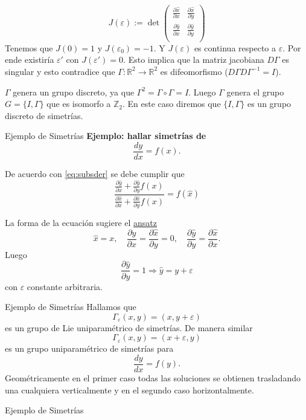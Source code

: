 \documentclass{article}
\newcommand{\rr}{\mathbb{R}}
\renewcommand{\emph}[1]{\textcolor[rgb]{1,0,0}{#1}}
\renewcommand{\epsilon}{\varepsilon}
\begin{document}
\[J(\epsilon):=\det\begin{pmatrix} \frac{\partial\hat{x}}{\partial x}&  \frac{\partial\hat{x}}{\partial y}\\
 \frac{\partial\hat{y}}{\partial x} &  \frac{\partial\hat{y}}{\partial y}\\
\end{pmatrix}
\]
 Tenemos que $J(0)=1$ y $J(\epsilon_0)=-1$. Y $J(\epsilon)$ es continua respecto a $\epsilon$. Por ende existiría $\epsilon'$ con $J(\epsilon')=0$. Esto implica que la matriz jacobiana $D\Gamma$ es singular y esto contradice que $\Gamma:\rr^2\to \rr^2$ es difeomorfismo ($D\Gamma D\Gamma^{-1}=I$).



 $\Gamma$  genera un grupo discreto, ya que $\Gamma^2=\Gamma\circ \Gamma=I$. Luego $\Gamma$ genera el grupo $G=\{I,\Gamma\}$ que es isomorfo a $\mathbb{Z}_2$. En este caso diremos que    $\{I,\Gamma\}$ es un \emph{grupo discreto} de simetrías.




 {Ejemplo de Simetrías}
 \textbf{Ejemplo: hallar simetrías de }
\[\frac{dy}{dx}=f(x).\]

De acuerdo con \eqref{eq:subsder} se debe cumplir que 
 \[\frac{\frac{\partial\hat{y}}{\partial x}+\frac{\partial\hat{y}}{\partial y}f(x)}{\frac{\partial\hat{x}}{\partial x}+\frac{\partial\hat{x}}{\partial y}f(x)}=f(\hat{x})\]

La forma de la ecuación sugiere el  \href{http://es.wikipedia.org/wiki/Ansatz}{ansatz}
   \[\boxed{\hat{x}=x},\quad \frac{\partial\hat{y}}{\partial x}=\frac{\partial\hat{x}}{\partial y}=0,\quad
   \frac{\partial\hat{y}}{\partial y}=\frac{\partial\hat{x}}{\partial x}. \]
 Luego 
\[\frac{\partial\hat{y}}{\partial y}=1\Rightarrow \boxed{\hat{y}=y+\epsilon} \]
con $\epsilon$ constante arbitraria.


{Ejemplo de Simetrías}
Hallamos que 
\[\Gamma_{\epsilon}(x,y)=(x,y+\epsilon)\]
es un grupo de Lie uniparamétrico de simetrías. De manera similar
\[\Gamma_{\epsilon}(x,y)=(x+\epsilon,y)\]
es un grupo uniparamétrico de simetrías para 
\[\frac{dy}{dx}=f(y).\]
Geométricamente en el primer caso todas las soluciones se obtienen trasladando una cualquiera verticalmente y en el segundo caso horizontalmente.



{Ejemplo de Simetrías}
\end{document}
